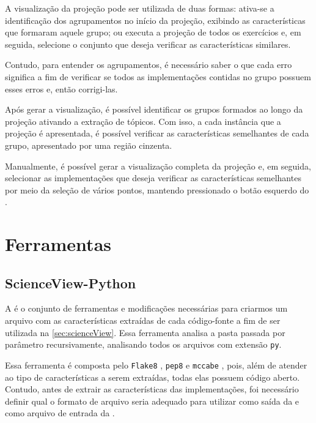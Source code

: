 			A visualização da projeção pode ser utilizada de duas formas: ativa-se a identificação
			dos agrupamentos no início da projeção, exibindo as características que formaram aquele
			grupo; ou executa a projeção de todos os exercícios e, em seguida, selecione o conjunto
			que deseja verificar as características similares.
			
			Contudo, para entender os agrupamentos, é necessário saber o que cada erro significa
			a fim de verificar se todos as implementações contidas no grupo possuem esses erros e,
			então corrigi-las.
			
			Após gerar a visualização, é possível identificar os grupos formados ao longo da
			projeção ativando a extração de tópicos. Com isso, a cada instância que a projeção
			é apresentada, é possível verificar as características semelhantes de cada grupo,
			apresentado por uma região cinzenta.
			
			Manualmente, é possível gerar a visualização completa da projeção e, em seguida,
			selecionar as implementações que deseja verificar as características semelhantes
			por meio da seleção de vários pontos, mantendo pressionado o botão esquerdo do
			.
		
	\section{Ferramentas}


		\subsection{ScienceView-Python}
		\label{sec:scienceView-Python}
			A  é o conjunto de ferramentas e modificações
			necessárias para criarmos um arquivo com as características extraídas de
			cada código-fonte a fim de ser utilizada na  \ref{sec:scienceView}.
			Essa ferramenta analisa a pasta passada por parâmetro recursivamente,
			analisando todos os arquivos com extensão \texttt{py}.
			
			Essa ferramenta é composta pelo \texttt{Flake8} \cite{flake8}, \texttt{pep8}
			\cite{pep8} e \texttt{mccabe} \cite{mccabe2013}, pois, além de atender ao tipo
			de características a serem extraídas, todas elas possuem código aberto. Contudo,
			antes de extrair as características das implementações, foi necessário definir
			qual o formato de arquivo seria adequado para utilizar como saída da
			 e como arquivo de entrada da .

